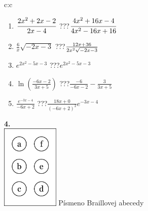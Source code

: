 \documentclass[10pt]{report}
\begin{document}
\begin{tabular}{c:c}
\begin{minipage}[c][104.5mm][t]{0.5\linewidth}
\begin{center}
\begin{minipage}{0.79\linewidth}
\begin{center}
\begin{varwidth}{\linewidth}
\begin{enumerate}
\item $\cfrac{2x^2+2x-2}{2x-4}$\quad \dotfill\; ???\;\dotfill \quad $\cfrac{4x^2+16x-4}{4x^2-16x+16}$
\item $\frac{6}{x}\sqrt{-2x-3}$\quad \dotfill\; ???\;\dotfill \quad $\frac{12x+36}{2x^2 \sqrt{\smash[b]{-2x-3}}}$
\item $e^{2x^2-5x-3}$\quad \dotfill\; ???\;\dotfill \quad $e^{2x^2-5x-3}$
\item $\ln{\left(\frac{-6x-2}{3x+5}\right)}$\quad \dotfill\; ???\;\dotfill \quad $\frac{-6}{-6x-2}-\frac{3}{3x+5}$
\item $\frac{e^{-3x-4}}{-6x+2}$\quad \dotfill\; ???\;\dotfill \quad $\frac{18x+0}{(-6x+2)^2}e^{-3x-4}$
\end{enumerate}
\end{varwidth}
\end{center}
\end{minipage}
\begin{minipage}{0.20\linewidth}
\begin{center}
{\Huge\bfseries 4.} \\[2mm]
\includegraphics[height=40mm]{../images/braille.png}
{\small Písmeno Braillovej abecedy}
\end{center}
\end{minipage}
\end{center}
\end{minipage}
%
\end{tabular}
\newpage
\thispagestyle{empty}
\end{document}
